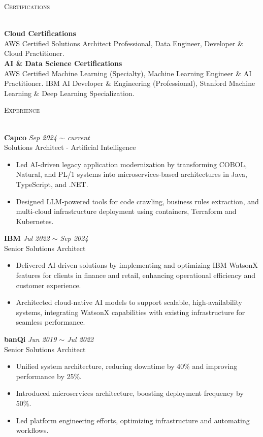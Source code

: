 \documentclass[a4paper]{article}
\newcommand{\lineunder} {
    \vspace*{-8pt} \\
    \hspace*{-18pt} \hrulefill \\
}
\newcommand{\header} [1] {
    \vspace{2mm}
    {\hspace*{-18pt}\vspace*{7pt} \textsc{#1}}
    \vspace*{-6pt} \lineunder
    \vspace{1mm}
}
\begin{document}
\header{Certifications}
\textbf{Cloud Certifications} \\
AWS Certified Solutions Architect Professional, Data Engineer, Developer \& Cloud Practitioner. \\
\vspace{0.5mm}
\textbf{AI \& Data Science Certifications} \\
AWS Certified Machine Learning (Specialty), Machine Learning Engineer \& AI Practitioner. IBM AI Developer \& Engineering (Professional), Stanford Machine Learning \& Deep Learning Specialization.

\header{Experience}
\textbf{Capco} \hfill \textit{Sep 2024 $\sim$ current} \\
Solutions Architect - Artificial Intelligence \\
\vspace{-2mm}
\begin{itemize}
\setlength\itemsep{-1mm}
    \item Led AI-driven legacy application modernization by transforming COBOL, Natural, and PL/1 systems into microservices-based architectures in Java, TypeScript, and .NET.
    \item Designed LLM-powered tools for code crawling, business rules extraction, and multi-cloud infrastructure deployment using containers, Terraform and Kubernetes.
\end{itemize}
\vspace{-1mm}
\textbf{IBM} \hfill \textit{Jul 2022 $\sim$ Sep 2024} \\
Senior Solutions Architect \\
\vspace{-2mm}
\begin{itemize}
\setlength\itemsep{-1mm}
    \item Delivered AI-driven solutions by implementing and optimizing IBM WatsonX features for clients in finance and retail, enhancing operational efficiency and customer experience.
    \item Architected cloud-native AI models to support scalable, high-availability systems, integrating WatsonX capabilities with existing infrastructure for seamless performance.
\end{itemize}
\vspace{-1mm}
\textbf{banQi} \hfill \textit{Jun 2019 $\sim$ Jul 2022} \\
Senior Solutions Architect \\
\vspace{-2mm}
\begin{itemize}
\setlength\itemsep{-1mm}
    \item Unified system architecture, reducing downtime by 40\% and improving performance by 25\%.
    \item Introduced microservices architecture, boosting deployment frequency by 50\%.
    \item Led platform engineering efforts, optimizing infrastructure and automating workflows.
\end{itemize}
\vspace{-2mm}
\end{document}
